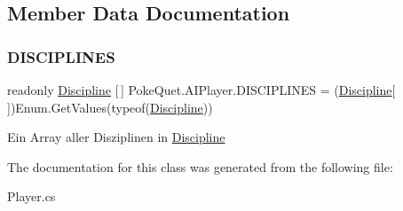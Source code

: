 \subsection{Member Data Documentation}
\mbox{\label{class_poke_quet_1_1_a_i_player_a72ab201b6fd3e18713da18d17824179a}} 
\subsubsection{\texorpdfstring{D\+I\+S\+C\+I\+P\+L\+I\+N\+ES}{DISCIPLINES}}
{\footnotesize\ttfamily readonly \mbox{\hyperlink{namespace_poke_quet_aa425f1b8cf90847021fe1177d6a7199d}{Discipline}} \mbox{[}$\,$\mbox{]} Poke\+Quet.\+A\+I\+Player.\+D\+I\+S\+C\+I\+P\+L\+I\+N\+ES = (\mbox{\hyperlink{namespace_poke_quet_aa425f1b8cf90847021fe1177d6a7199d}{Discipline}}\mbox{[}$\,$\mbox{]})Enum.\+Get\+Values(typeof(\mbox{\hyperlink{namespace_poke_quet_aa425f1b8cf90847021fe1177d6a7199d}{Discipline}}))\hspace{0.3cm}{\ttfamily [static]}}



Ein Array aller Disziplinen in \mbox{\hyperlink{namespace_poke_quet_aa425f1b8cf90847021fe1177d6a7199d}{Discipline}} 



The documentation for this class was generated from the following file\+:\begin{DoxyCompactItemize}
\item 
Player.\+cs\end{DoxyCompactItemize}
